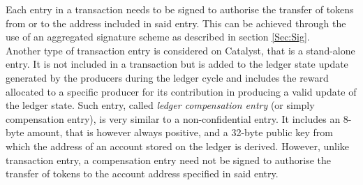 Each entry in a transaction needs to be signed to authorise the transfer of tokens from or to the address included in said entry. This can be achieved through the use of an aggregated signature scheme as described in section \ref{Sec:Sig}. \\

Another type of transaction entry is considered on Catalyst, that is a stand-alone entry. It is not included in a transaction but is added to the ledger state update generated by the producers during the ledger cycle and includes the reward allocated to a specific producer for its contribution in producing a valid update of the ledger state. Such entry, called \textit{ledger compensation entry} (or simply compensation entry), is very similar to a non-confidential entry. It includes an 8-byte amount, that is however always positive, and a 32-byte public key from which the address of an account stored on the ledger is derived. However, unlike transaction entry, a compensation entry need not be signed to authorise the transfer of tokens to the account address specified in said entry. 

